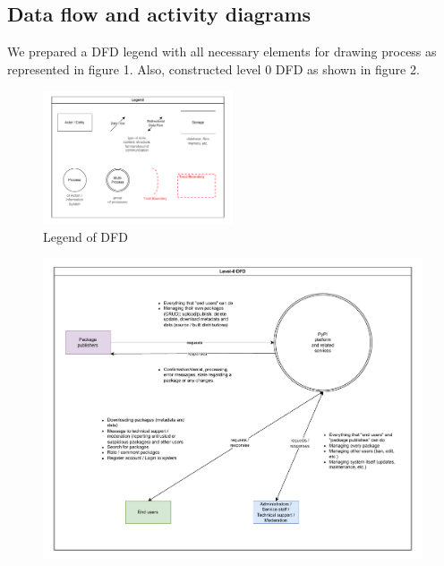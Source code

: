 \documentclass[letterpaper,12pt]{report}
\begin{document}
\subsection{Data flow and activity diagrams}

We prepared a DFD legend with all necessary elements for drawing process as represented in figure 1. Also, constructed level 0 DFD as shown in figure 2.
\begin{figure}[htpb!]
    \centering
    \includegraphics[width=0.5\textwidth]{figure_1}
    \caption{Legend of DFD}
    \label{fig:figure1}
\end{figure}

\begin{figure}[htpb!]
    \centering
    \includegraphics[width=1\textwidth]{figure_2}
    \caption[Level-0 DFD]
    \label{fig:figure2}
\end{figure}
\end{document}
